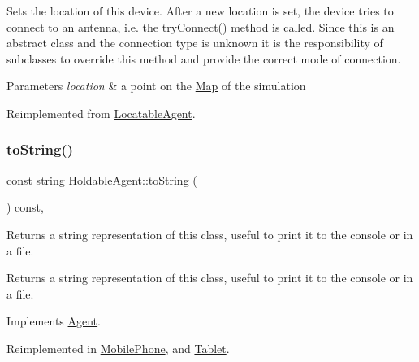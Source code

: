Sets the location of this device. After a new location is set, the device tries to connect to an antenna, i.\+e. the \mbox{\hyperlink{class_holdable_agent_a0789d757d81b43ee016e9362046f6dea}{try\+Connect()}} method is called. Since this is an abstract class and the connection type is unknown it is the responsibility of subclasses to override this method and provide the correct mode of connection. 
\begin{DoxyParams}{Parameters}
{\em location} & a point on the \mbox{\hyperlink{class_map}{Map}} of the simulation \\
\hline
\end{DoxyParams}


Reimplemented from \mbox{\hyperlink{class_locatable_agent_a754b237c404b77714fedd397f214bc02}{Locatable\+Agent}}.

\mbox{\label{class_holdable_agent_a2c581226b8994f24b6b2306ae17dbb52}} 
\subsubsection{\texorpdfstring{toString()}{toString()}}
{\footnotesize\ttfamily const string Holdable\+Agent\+::to\+String (\begin{DoxyParamCaption}{ }\end{DoxyParamCaption}) const\hspace{0.3cm}{\ttfamily [override]}, {\ttfamily [virtual]}}

Returns a string representation of this class, useful to print it to the console or in a file. \begin{DoxyReturn}{Returns}
a string representation of this class, useful to print it to the console or in a file. 
\end{DoxyReturn}


Implements \mbox{\hyperlink{class_agent_a44f291596d10c7878b0641d6ec156328}{Agent}}.



Reimplemented in \mbox{\hyperlink{class_mobile_phone_a2b7e556d12a43e380786ad0eccf3ce04}{Mobile\+Phone}}, and \mbox{\hyperlink{class_tablet_a3fae01e7d526699476221c6a686a4fba}{Tablet}}.

\mbox{\label{class_holdable_agent_a0789d757d81b43ee016e9362046f6dea}} 
